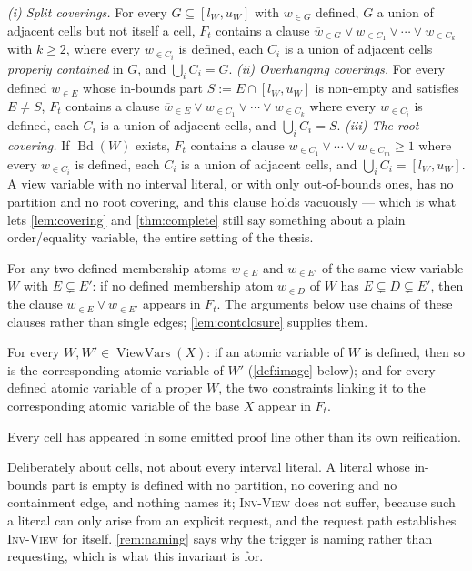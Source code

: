 \documentclass[11pt,a4paper]{article}
\theoremstyle{plain}
\theoremstyle{definition}
\theoremstyle{remark}
\newcommand{\fname}[1]{\ensuremath{\operatorname{#1}}}
\newcommand{\ViewVars}{\fname{ViewVars}}
\newcommand{\Bdry}{\fname{Bd}}
\newcommand{\atset}[2]{#1_{\in #2}}
\newcommand{\natset}[2]{\overline{#1}_{\in #2}}
\newcommand{\inv}[1]{\textnormal{\textsc{Inv-#1}}}
\newcommand{\invCover}{\inv{Cover}}
\newcommand{\invCont}{\inv{Cont}}
\newcommand{\invView}{\inv{View}}
\newcommand{\invName}{\inv{Name}}
\begin{document}
\begin{description}[font=\normalfont\bfseries,leftmargin=3.2em,style=nextline]
\item[\invCover{}: coverings.]
  \emph{(i) Split coverings.}  For every $G\subseteq[l_W,u_W]$ with
  $\atset{w}{G}$ defined, $G$ a union of adjacent cells but not itself a cell,
  $F_t$ contains a clause
  $\natset{w}{G}\vee\atset{w}{C_1}\vee\cdots\vee\atset{w}{C_k}$ with $k\geq 2$,
  where every $\atset{w}{C_i}$ is defined, each $C_i$ is a union of adjacent
  cells \emph{properly contained} in $G$, and $\bigcup_i C_i = G$.
  \emph{(ii) Overhanging coverings.}  For every defined $\atset{w}{E}$ whose
  in-bounds part $S := E\cap[l_W,u_W]$ is non-empty and satisfies $E\neq S$,
  $F_t$ contains a clause
  $\natset{w}{E}\vee\atset{w}{C_1}\vee\cdots\vee\atset{w}{C_k}$ where every
  $\atset{w}{C_i}$ is defined, each $C_i$ is a union of adjacent cells, and
  $\bigcup_i C_i = S$.
  \emph{(iii) The root covering.}  If $\Bdry(W)$ exists, $F_t$ contains a clause
  $\atset{w}{C_1}\vee\cdots\vee\atset{w}{C_m}\geq 1$ where every
  $\atset{w}{C_i}$ is defined, each $C_i$ is a union of adjacent cells, and
  $\bigcup_i C_i = [l_W,u_W]$.  A view variable
  with no interval literal, or with only out-of-bounds ones, has no partition and
  no root covering, and this clause holds vacuously --- which is what lets
  \cref{lem:covering} and \cref{thm:complete} still say something about a plain
  order/equality variable, the entire setting of the thesis.

\item[\invCont{}: containment.]
  For any two defined membership atoms $\atset{w}{E}$ and $\atset{w}{E'}$ of the
  same view variable $W$ with $E\subsetneq E'$: if no defined membership atom
  $\atset{w}{D}$ of $W$ has $E\subsetneq D\subsetneq E'$, then the clause
  $\natset{w}{E}\vee\atset{w}{E'}$ appears in $F_t$.  The arguments below use
  chains of these clauses rather than single edges; \cref{lem:contclosure}
  supplies them.

\item[\invView{}: view closure and linking.]
  For every $W,W'\in\ViewVars(X)$: if an atomic variable of $W$ is defined, then so is
  the corresponding atomic variable of $W'$ (\cref{def:image} below); and for
  every defined atomic variable of a proper $W$, the two constraints linking it to
  the corresponding atomic variable of the base $X$ appear in $F_t$.

\item[\invName{}: cells are named.]
  Every cell has appeared in some emitted proof line other than its own
  reification.

  Deliberately about cells, not about every interval literal.  A literal whose
  in-bounds part is empty is defined with no partition, no covering and no
  containment edge, and nothing names it; \invView{} does not suffer, because such
  a literal can only arise from an explicit request, and the request path
  establishes \invView{} for itself.  \cref{rem:naming} says why the trigger is
  naming rather than requesting, which is what this invariant is for.

\end{description}
\end{document}
